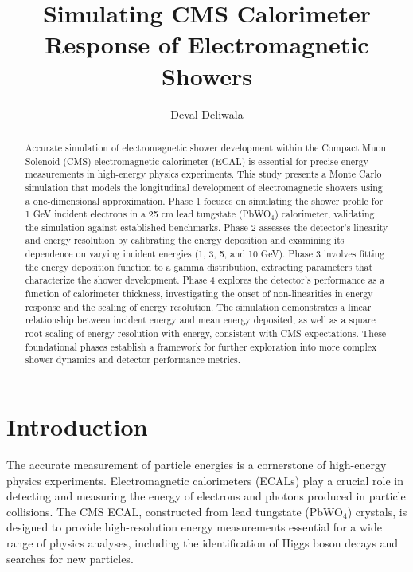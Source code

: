 \documentclass[twocolumn]{aastex631}
\begin{document}
\title{Simulating CMS Calorimeter Response of Electromagnetic Showers}

\author{Deval Deliwala}


\begin{abstract}
Accurate simulation of electromagnetic shower development within the Compact Muon Solenoid (CMS) electromagnetic calorimeter (ECAL) is essential for precise energy measurements in high-energy physics experiments. This study presents a Monte Carlo simulation that models the longitudinal development of electromagnetic showers using a one-dimensional approximation. Phase 1 focuses on simulating the shower profile for 1 GeV incident electrons in a 25 cm lead tungstate (PbWO\(_4\)) calorimeter, validating the simulation against established benchmarks. Phase 2 assesses the detector's linearity and energy resolution by calibrating the energy deposition and examining its dependence on varying incident energies (1, 3, 5, and 10 GeV). Phase 3 involves fitting the energy deposition function to a gamma distribution, extracting parameters that characterize the shower development. Phase 4 explores the detector's performance as a function of calorimeter thickness, investigating the onset of non-linearities in energy response and the scaling of energy resolution. The simulation demonstrates a linear relationship between incident energy and mean energy deposited, as well as a square root scaling of energy resolution with energy, consistent with CMS expectations. These foundational phases establish a framework for further exploration into more complex shower dynamics and detector performance metrics.
\end{abstract}

\section{Introduction}

The accurate measurement of particle energies is a cornerstone of high-energy physics experiments. Electromagnetic calorimeters (ECALs) play a crucial role in detecting and measuring the energy of electrons and photons produced in particle collisions. The CMS ECAL, constructed from lead tungstate (PbWO\(_4\)) crystals, is designed to provide high-resolution energy measurements essential for a wide range of physics analyses, including the identification of Higgs boson decays and searches for new particles.
\end{document}
